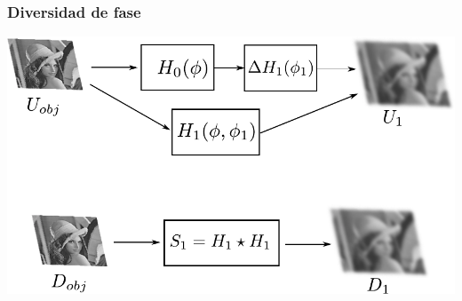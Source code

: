 \documentclass[serif,8pt]{beamer}
\begin{document}
		\begin{frame}
		\frametitle{Diversidad de fase}
		\vspace*{20pt}
		\begin{multicols}{2}
		
\includegraphics[scale=0.55]{img/PDFun.pdf}
		
		\newpage
		

\end{multicols}
\end{frame}
\end{document}
